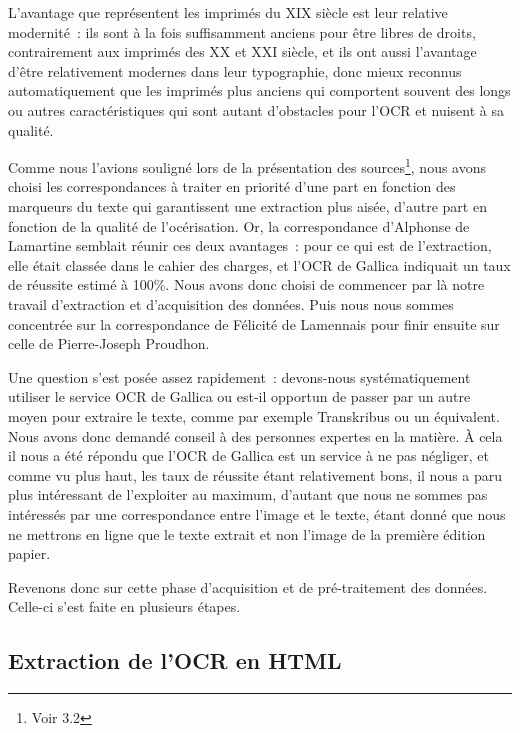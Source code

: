 L'avantage que représentent les imprimés du XIX siècle est leur relative modernité~: ils sont à la fois suffisamment anciens pour être libres de droits, contrairement aux imprimés des XX et XXI siècle, et ils ont aussi l'avantage d'être relativement modernes dans leur typographie, donc mieux reconnus automatiquement que les imprimés plus anciens qui comportent souvent des  longs ou autres caractéristiques qui sont autant d'obstacles pour l'OCR et nuisent à sa qualité.

Comme nous l'avions souligné lors de la présentation des sources\footnote{Voir 3.2}, nous avons choisi les correspondances à traiter en priorité d'une part en fonction des marqueurs du texte qui garantissent une extraction plus aisée, d'autre part en fonction de la qualité de l'océrisation. 
Or, la correspondance d'Alphonse de Lamartine semblait réunir ces deux avantages~: pour ce qui est de l'extraction, elle était classée  dans le cahier des charges, et l'OCR de Gallica indiquait un taux de réussite estimé à 100\%. Nous avons donc choisi de commencer par là notre travail d'extraction et d'acquisition des données. Puis nous nous sommes concentrée sur la correspondance de Félicité de Lamennais pour finir ensuite sur celle de Pierre-Joseph Proudhon. 

Une question s'est posée assez rapidement~: devons-nous systématiquement utiliser le service OCR de Gallica ou est-il opportun de passer par un autre moyen pour extraire le texte, comme par exemple Transkribus ou un équivalent. Nous avons donc demandé conseil à des personnes expertes en la matière. À cela il nous a été répondu que l'OCR de Gallica est un service à ne pas négliger, et comme vu plus haut, les taux de réussite étant relativement bons, il nous a paru plus intéressant de l'exploiter au maximum, d'autant que nous ne sommes pas intéressés par une correspondance entre l'image et le texte, étant donné que nous ne mettrons en ligne que le texte extrait et non l'image de la première édition papier. 

Revenons donc sur cette phase d'acquisition et de pré-traitement des données. Celle-ci s'est faite en plusieurs étapes. 

\subsection{Extraction de l'OCR en HTML}

